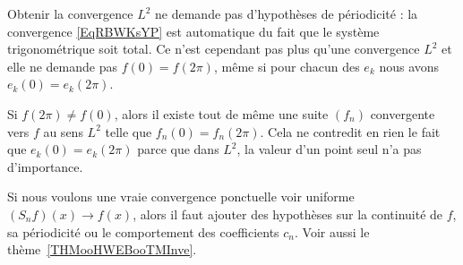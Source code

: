 \begin{normaltext}
    Obtenir la convergence \( L^2\) ne demande pas d'hypothèses de périodicité : la convergence \eqref{EqRBWKsYP} est automatique du fait que le système trigonométrique soit total. Ce n'est cependant pas plus qu'une convergence \( L^2\) et elle ne demande pas \( f(0)=f(2\pi)\), même si pour chacun des \( e_k\) nous avons \( e_k(0)=e_k(2\pi)\).

    Si \( f(2\pi)\neq f(0)\), alors il existe tout de même une suite \( (f_n)\) convergente vers \( f\) au sens \( L^2\) telle que \( f_n(0)=f_n(2\pi)\). Cela ne contredit en rien le fait que \( e_k(0)=e_k(2\pi)\) parce que dans \( L^2\), la valeur d'un point seul n'a pas d'importance.

    Si nous voulons une vraie convergence ponctuelle voir uniforme \( (S_nf)(x)\to f(x)\), alors il faut ajouter des hypothèses sur la continuité de \( f\), sa périodicité ou le comportement des coefficients \( c_n\). Voir aussi le thème~\ref{THMooHWEBooTMInve}.
\end{normaltext}

